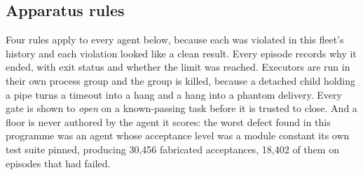 \subsection{Apparatus rules}

Four rules apply to every agent below, because each was violated in this fleet's history and each violation looked like a clean result. Every episode records why it ended, with exit status and whether the limit was reached. Executors are run in their own process group and the group is killed, because a detached child holding a pipe turns a timeout into a hang and a hang into a phantom delivery. Every gate is shown to \emph{open} on a known-passing task before it is trusted to close. And a floor is never authored by the agent it scores: the worst defect found in this programme was an agent whose acceptance level was a module constant its own test suite pinned, producing 30,456 fabricated acceptances, 18,402 of them on episodes that had failed.
